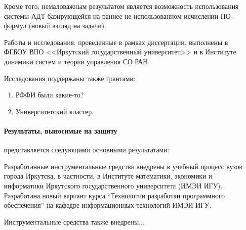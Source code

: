 Кроме того, немаловажным результатом является возможность использования системы АДТ базирующейся на раннее не использованном исчислении ПО--формул (новый взгляд на задачи).

Работы и исследования, проведенные в рамках  диссертации, выполнены в ФГБОУ ВПО <<Иркутский государственный университет>> и в Институте динамики систем и теории управления СО РАН.

Исследования поддержаны также грантами:
\begin{enumerate}
\item РФФИ были какие-то?
\item Университетский кластер.
\end{enumerate}

\paragraph{Результаты, выносимые на защиту}\hspace{-1em} представляется следующими основными результатами:

Разработанные инструментальные средства внедрены в учебный процесс вузов города Иркутска, в частности, в Институте математики, экономики и информатики Иркутского государственного университета (ИМЭИ ИГУ). Разработана новый вариант курса ``Технологии разработки программного обеспечения'' на кафедре информационных технологий ИМЭИ ИГУ.


Инструментальные средства также внедрены...




